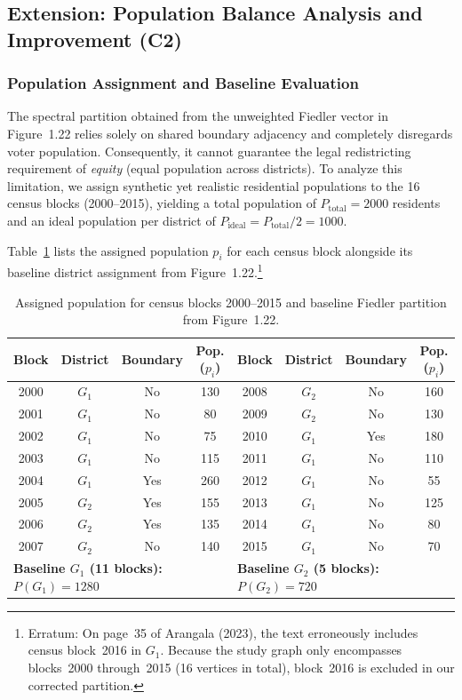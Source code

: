 \documentclass[11pt, a4paper]{article}
\begin{document}
\subsection{Extension: Population Balance Analysis and Improvement (C2)}

\subsubsection{Population Assignment and Baseline Evaluation}

The spectral partition obtained from the unweighted Fiedler vector in Figure~1.22 relies solely on shared boundary adjacency and completely disregards voter population. Consequently, it cannot guarantee the legal redistricting requirement of \textit{equity} (equal population across districts). To analyze this limitation, we assign synthetic yet realistic residential populations to the 16 census blocks (2000--2015), yielding a total population of $P_{\text{total}} = 2000$ residents and an ideal population per district of $P_{\text{ideal}} = P_{\text{total}} / 2 = 1000$.

Table~\ref{tab:c2_block_pop} lists the assigned population $p_i$ for each census block alongside its baseline district assignment from Figure~1.22.\footnote{Erratum: On page~35 of Arangala (2023), the text erroneously includes census block~2016 in $G_1$. Because the study graph only encompasses blocks~2000 through~2015 (16 vertices in total), block~2016 is excluded in our corrected partition.}

\begin{table}[htbp]
\centering
\caption{Assigned population for census blocks 2000--2015 and baseline Fiedler partition from Figure~1.22.}
\label{tab:c2_block_pop}
\begin{tabular}{@{}cccc|cccc@{}}
\toprule
Block & District & Boundary & Pop. ($p_i$) & Block & District & Boundary & Pop. ($p_i$) \\
\midrule
2000 & $G_1$ & No  & 130 & 2008 & $G_2$ & No  & 160 \\
2001 & $G_1$ & No  & 80  & 2009 & $G_2$ & No  & 130 \\
2002 & $G_1$ & No  & 75  & 2010 & $G_1$ & Yes & 180 \\
2003 & $G_1$ & No  & 115 & 2011 & $G_1$ & No  & 110 \\
2004 & $G_1$ & Yes & 260 & 2012 & $G_1$ & No  & 55  \\
2005 & $G_2$ & Yes & 155 & 2013 & $G_1$ & No  & 125 \\
2006 & $G_2$ & Yes & 135 & 2014 & $G_1$ & No  & 80  \\
2007 & $G_2$ & No  & 140 & 2015 & $G_1$ & No  & 70  \\
\midrule
\multicolumn{4}{l|}{\textbf{Baseline $G_1$ (11 blocks):} $P(G_1) = 1280$} & \multicolumn{4}{l}{\textbf{Baseline $G_2$ (5 blocks):} $P(G_2) = 720$} \\
\bottomrule
\end{tabular}
\end{table}
\end{document}
